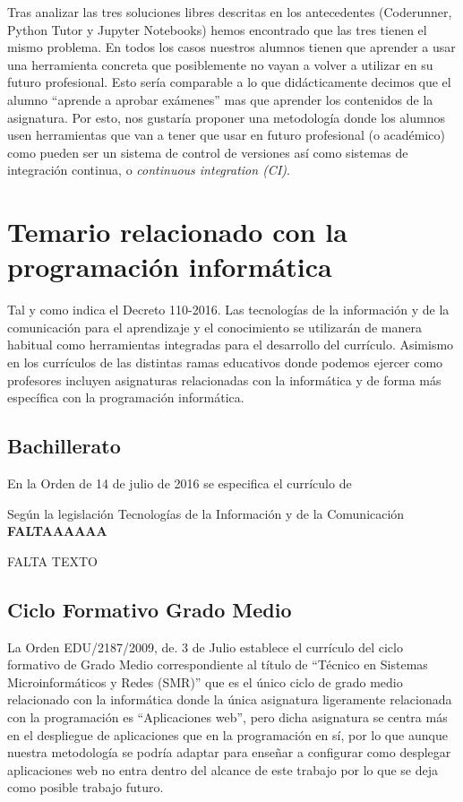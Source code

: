 Tras analizar las tres soluciones libres descritas en los antecedentes (Coderunner, Python Tutor y Jupyter Notebooks) hemos encontrado que las tres tienen el mismo problema. En todos los casos nuestros alumnos tienen que aprender a usar una herramienta concreta que posiblemente no vayan a volver a utilizar en su futuro profesional. Esto sería comparable a lo que didácticamente decimos que el alumno ``aprende a aprobar exámenes'' mas que aprender los contenidos de la asignatura. Por esto, nos gustaría proponer una metodología donde los alumnos usen herramientas que van a tener que usar en futuro profesional (o académico) como pueden ser un sistema de control de versiones así como sistemas de integración continua, o \textit{continuous integration (CI)}.

\section {Temario relacionado con la programación informática}

Tal y como indica el Decreto 110-2016. Las tecnologías de la información y de la comunicación para el aprendizaje y el conocimiento se utilizarán de manera habitual como herramientas integradas para el desarrollo del currículo. Asimismo en los currículos de las distintas ramas educativos donde podemos ejercer como profesores incluyen asignaturas relacionadas con la informática y de forma más específica con la programación informática.

\subsection {Bachillerato}

En la Orden de 14 de julio de 2016 se especifica el currículo de

Según la legislación Tecnologías de la Información y de la Comunicación \textbf{FALTAAAAAA}


FALTA TEXTO

\subsection {Ciclo Formativo Grado Medio}

La Orden EDU/2187/2009, de. 3 de Julio establece el currículo del ciclo formativo de Grado Medio correspondiente al título de ``Técnico en Sistemas Microinformáticos y Redes (SMR)'' que es el único ciclo de grado medio relacionado con la informática donde la única asignatura ligeramente relacionada con la programación es ``Aplicaciones web'', pero dicha asignatura se centra más en el despliegue de aplicaciones que en la programación en sí, por lo que aunque nuestra metodología se podría adaptar para enseñar a configurar como desplegar aplicaciones web no entra dentro del alcance de este trabajo por lo que se deja como posible trabajo futuro.

